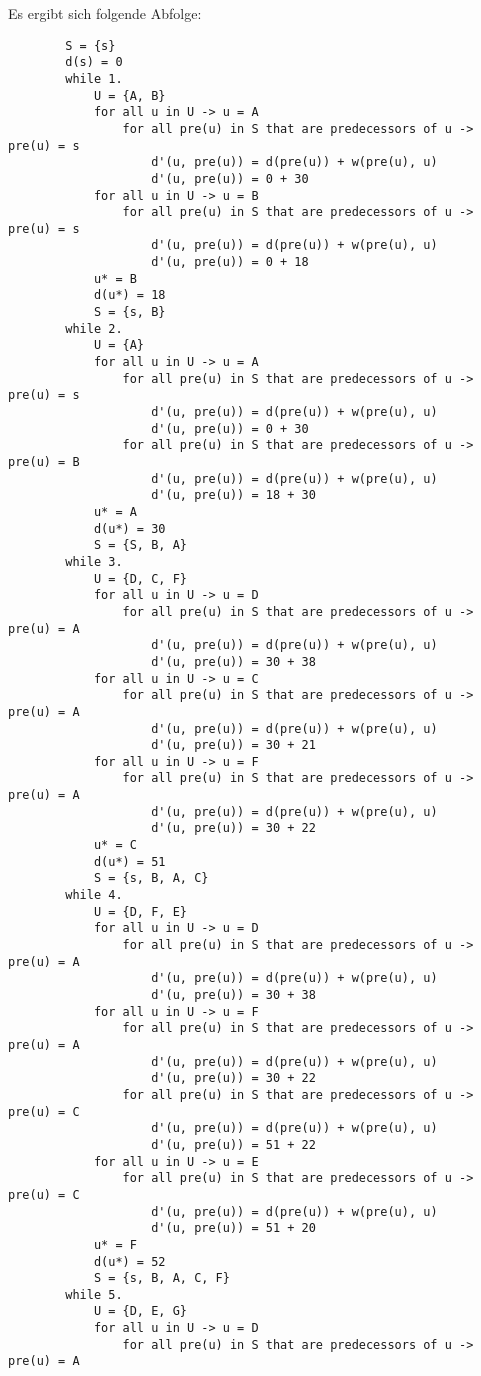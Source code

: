 \documentclass[10pt,a4paper,oneside,ngerman,numbers=noenddot]{scrartcl}
\begin{document}
		Es ergibt sich folgende Abfolge:
		\begin{verbatim}
		S = {s}
		d(s) = 0
		while 1.
		    U = {A, B}
		    for all u in U -> u = A
		        for all pre(u) in S that are predecessors of u -> pre(u) = s
		            d'(u, pre(u)) = d(pre(u)) + w(pre(u), u)
		            d'(u, pre(u)) = 0 + 30
		    for all u in U -> u = B
		        for all pre(u) in S that are predecessors of u -> pre(u) = s
		            d'(u, pre(u)) = d(pre(u)) + w(pre(u), u)
		            d'(u, pre(u)) = 0 + 18
		    u* = B
		    d(u*) = 18
		    S = {s, B}
		while 2.
		    U = {A}
		    for all u in U -> u = A
		        for all pre(u) in S that are predecessors of u -> pre(u) = s
		            d'(u, pre(u)) = d(pre(u)) + w(pre(u), u)
		            d'(u, pre(u)) = 0 + 30
		        for all pre(u) in S that are predecessors of u -> pre(u) = B
		            d'(u, pre(u)) = d(pre(u)) + w(pre(u), u)
		            d'(u, pre(u)) = 18 + 30
		    u* = A
		    d(u*) = 30
		    S = {S, B, A}
		while 3.
		    U = {D, C, F}
		    for all u in U -> u = D
		        for all pre(u) in S that are predecessors of u -> pre(u) = A
		            d'(u, pre(u)) = d(pre(u)) + w(pre(u), u)
		            d'(u, pre(u)) = 30 + 38
		    for all u in U -> u = C
		        for all pre(u) in S that are predecessors of u -> pre(u) = A
		            d'(u, pre(u)) = d(pre(u)) + w(pre(u), u)
		            d'(u, pre(u)) = 30 + 21
		    for all u in U -> u = F
		        for all pre(u) in S that are predecessors of u -> pre(u) = A
		            d'(u, pre(u)) = d(pre(u)) + w(pre(u), u)
		            d'(u, pre(u)) = 30 + 22
		    u* = C
		    d(u*) = 51
		    S = {s, B, A, C}
		while 4.
		    U = {D, F, E}
		    for all u in U -> u = D
		        for all pre(u) in S that are predecessors of u -> pre(u) = A
		            d'(u, pre(u)) = d(pre(u)) + w(pre(u), u)
		            d'(u, pre(u)) = 30 + 38
		    for all u in U -> u = F
		        for all pre(u) in S that are predecessors of u -> pre(u) = A
		            d'(u, pre(u)) = d(pre(u)) + w(pre(u), u)
		            d'(u, pre(u)) = 30 + 22
		        for all pre(u) in S that are predecessors of u -> pre(u) = C
		            d'(u, pre(u)) = d(pre(u)) + w(pre(u), u)
		            d'(u, pre(u)) = 51 + 22
		    for all u in U -> u = E
		        for all pre(u) in S that are predecessors of u -> pre(u) = C
		            d'(u, pre(u)) = d(pre(u)) + w(pre(u), u)
		            d'(u, pre(u)) = 51 + 20
		    u* = F
		    d(u*) = 52
		    S = {s, B, A, C, F}
		while 5.
		    U = {D, E, G}
		    for all u in U -> u = D
		        for all pre(u) in S that are predecessors of u -> pre(u) = A

\end{verbatim}
\end{document}
